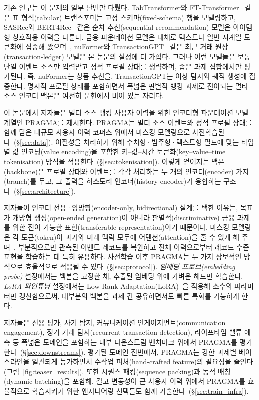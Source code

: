 기존 연구는 이 문제의 일부 단면만 다뤘다.
TabTransformer와 FT-Transformer~\citep{huang2020tabtransformer,gorishniy2021revisiting} 같은 표 형식(tabular) 트랜스포머는 고정 스키마(fixed-schema) 행을 모델링하고, SASRec와 BERT4Rec~\citep{kang2018self,sun2019bert4rec} 같은 순차 추천(sequential recommendation) 모델은 아이템형 상호작용 이력을 다룬다.
금융 파운데이션 모델은 대체로 텍스트나 일반 시계열 토큰화에 집중해 왔으며~\citep{yang2020finbert,wu2023bloomberggpt,yang2023fingpt,jin2024timellm,ansari2024chronos}, nuFormer와 TransactionGPT~\citep{braithwaite2025your,dou2025transactiongpt} 같은 최근 거래 원장(transaction-ledger) 모델은 본 논문의 설정에 더 가깝다.
그러나 이런 모델들은 보통 단일 이벤트 소스만 입력받고 정적 프로필 상태를 생략하며, 좁은 과제 집합에서만 평가된다. 즉, nuFormer는 상품 추천을, TransactionGPT는 이상 탐지와 궤적 생성에 집중한다.
명시적 프로필 상태를 포함하면서 폭넓은 판별적 뱅킹 과제로 전이되는 멀티 소스 인코더 백본은 여전히 문헌에서 비어 있는 자리다.

이 논문에서 저자들은 멀티 소스 뱅킹 사용자 이력을 위한 인코더형 파운데이션 모델 계열인 PRAGMA를 제시한다.
PRAGMA는 멀티 소스 이벤트와 정적 프로필 상태를 함께 담은 대규모 사용자 이력 코퍼스 위에서 마스킹 모델링으로 사전학습된다~(\S\ref{sec:data}).
이질성을 처리하기 위해 수치형·범주형·텍스트형 필드에 맞는 타입별 값 인코딩(value encoding)을 포함한 키--값--시간 토큰화(key--value--time tokenisation) 방식을 적용한다~(\S\ref{sec:tokenisation}).
이렇게 얻어지는 백본(backbone)은 프로필 상태와 이벤트를 각각 처리하는 두 개의 인코더(encoder) 가지(branch)를 두고, 그 출력을 히스토리 인코더(history encoder)가 융합하는 구조다~(\S\ref{sec:architecture}).

저자들이 인코더 전용·양방향(encoder-only, bidirectional) 설계를 택한 이유는, 목표가 개방형 생성(open-ended generation)이 아니라 판별적(discriminative) 금융 과제를 위한 전이 가능한 표현(transferable representation)이기 때문이다.
마스킹 모델링은 각 토큰(token)이 과거와 미래 맥락 모두에 어텐션(attention)을 줄 수 있게 해 주며~\citep{devlin2019bert}, 부분적으로만 관측된 이벤트 레코드를 복원하고 전체 이력으로부터 레코드 수준 표현을 학습하는 데 특히 유용하다.
사전학습 이후 PRAGMA는 두 가지 상보적인 방식으로 효율적으로 적응될 수 있다~(\S\ref{sec:protocol}).
\emph{임베딩 프로브(embedding probe)} 설정에서는 백본을 고정한 채, 추출된 임베딩 위에 가벼운 헤드만 학습한다.
\emph{LoRA 파인튜닝} 설정에서는 Low-Rank Adaptation(LoRA)~\citep{hu2022lora}을 적용해 소수의 파라미터만 갱신함으로써, 대부분의 백본을 과제 간 공유하면서도 빠른 특화를 가능하게 한다.

저자들은 신용 평가, 사기 탐지, 커뮤니케이션 인게이지먼트(communication engagement), 정기 거래 탐지(recurrent transaction detection), 라이프타임 밸류 예측 등 폭넓은 도메인을 포함하는 내부 다운스트림 벤치마크 위에서 PRAGMA를 평가한다~(\S\ref{sec:downstreams}).
평가된 도메인 전반에서, PRAGMA는 강한 과제별 베이스라인을 일관되게 능가하면서 수작업 피처(hand-crafted feature)의 필요성을 줄인다(그림~\ref{fig:teaser_results}).
또한 시퀀스 패킹(sequence packing)과 동적 배칭(dynamic batching)을 포함해, 길고 변동성이 큰 사용자 이력 위에서 PRAGMA를 효율적으로 학습시키기 위한 엔지니어링 선택들도 함께 기술한다~(\S\ref{sec:train_infra}).


